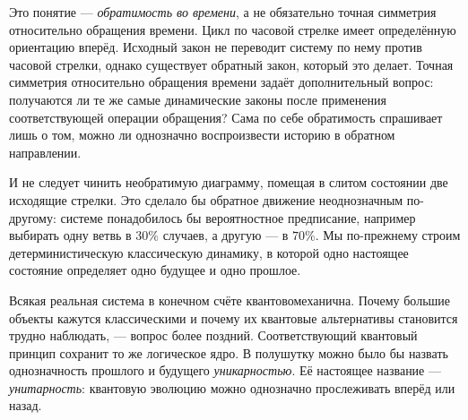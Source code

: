 \begin{classroomqa}
\end{classroomqa}

Это понятие — \emph{обратимость во времени}, а не обязательно точная симметрия относительно обращения времени. Цикл по часовой стрелке имеет определённую ориентацию вперёд. Исходный закон не переводит систему по нему против часовой стрелки, однако существует обратный закон, который это делает. Точная симметрия относительно обращения времени задаёт дополнительный вопрос: получаются ли те же самые динамические законы после применения соответствующей операции обращения? Сама по себе обратимость спрашивает лишь о том, можно ли однозначно воспроизвести историю в обратном направлении.

\begin{classroomqa}
\end{classroomqa}

И не следует чинить необратимую диаграмму, помещая в слитом состоянии две исходящие стрелки. Это сделало бы обратное движение неоднозначным по-другому: системе понадобилось бы вероятностное предписание, например выбирать одну ветвь в \(30\%\) случаев, а другую — в \(70\%\). Мы по-прежнему строим детерминистическую классическую динамику, в которой одно настоящее состояние определяет одно будущее и одно прошлое.

Всякая реальная система в конечном счёте квантовомеханична. Почему большие объекты кажутся классическими и почему их квантовые альтернативы становится трудно наблюдать, — вопрос более поздний. Соответствующий квантовый принцип сохранит то же логическое ядро. В полушутку можно было бы назвать однозначность прошлого и будущего \emph{уникарностью}. Её настоящее название — \emph{унитарность}: квантовую эволюцию можно однозначно прослеживать вперёд или назад.

